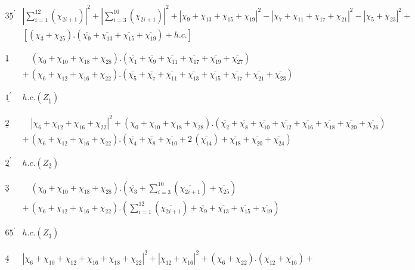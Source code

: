 \documentclass[a4paper,11pt]{article}
\newcommand{\ch}[1]{\chi_{#1}}
\newcommand{\och}[1]{\overline{\chi_{#1}}}
\newcommand{\ud}[1]{\underline{#1}}
\newcommand{\xaa}[2]{|\chi_{#1} + \chi_{#2}|^2}
\newcommand{\xaaaa}[4]{|\chi_{#1} + \chi_{#2}+ \chi_{#3}+ \chi_{#4}|^2}
\newcommand{\xaaaaaa}[6]{|\chi_{#1} + \chi_{#2}+ \chi_{#3}+ \chi_{#4}+
                             \chi_{#5} + \chi_{#6}|^2}
\begin{document}
\begin{table}
$$\begin{array}{|c||l|}
\hline
{}  & {}  \\
\ud{35^{'}}  & |\sum_{i=1}^{12}(\ch{2i+1})|^{2} +
|\sum_{i=3}^{10}(\ch{2i+1})|^{2} +
          \xaaaa{9}{13}{15}{19} - \xaaaa{7}{11}{17}{21} - \xaa{5}{23} + \\
{}  & [(\ch{3} + \ch{25}).(\och{9} + \och{13} + \och{15} + \och{19}) + h.c.] \\
{}  & {} \\
\hline
\hline
{}  &  {}  \\
\ud1  &  \quad (\ch{0} + \ch{10} + \ch{18} + \ch{28}).
(\och{1} + \och{9} + \och{11} + \och{17} + \och{19} + \och{27})
           \\
{}  & + \,(\ch{6} + \ch{12} + \ch{16} + \ch{22}).
(\och{5} + \och{7} + \och{11} + \och{13} + \och{15} + \och{17}
+ \och{21} + \och{23})\\
{}  &  {}  \\
\hline
{}  &  {}  \\
\ud{1^{'}}  &  h.c. (Z_{\ud1}) \\
{}  &  {}  \\
\hline
{}  &  {} \\
\ud2  & \quad \xaaaa{6}{12}{16}{22} + (\ch{0} +\ch{10} + \ch{18} +
\ch{28}).(\och{2} + \och{8} + \och{10} + \och{12} + \och{16} +
\och{18} + \och{20} + \och{26}) \\
{}  & + \, (\ch{6} +\ch{12} + \ch{16} + \ch{22}).(\och{4} + \och{8} +
\och{10} + 2\,(\och{14}) + \och{18} + \och{20} + \och{24}) \\
{}  & {} \\
\hline
{}  &  {} \\
\ud{2^{'}}  &  h.c. (Z_{\ud2}) \\
{}  &  {}  \\
\hline
{}  &  {} \\
\ud3  &  \quad (\ch{0} +\ch{10} + \ch{18} + \ch{28}) .\left( \och{3}
+ \sum_{i=3}^{10}(\och{2i+1}) + \och{25} \right)  \\
{}  & + \, (\ch{6} +\ch{12} + \ch{16} + \ch{22}). \left(
\sum_{i=1}^{12}(\och{2i+1}) + \och{9} + \och{13} + \och{15}
+ \och{19} \right)\\
{}  & {} \\
\hline
{}  & {} \\
\ud{65^{'}}  &  h.c. (Z_{\ud3}) \\
{}  &  {}  \\
\hline
{}  &  {}  \\
\ud4  & \xaaaaaa{6}{10}{12}{16}{18}{22} + \xaa{12}{16} + (\ch{6} +
\ch{22}).(\och{12} + \och{16}) + \\

\end{array}$$
\end{table}
\end{document}

